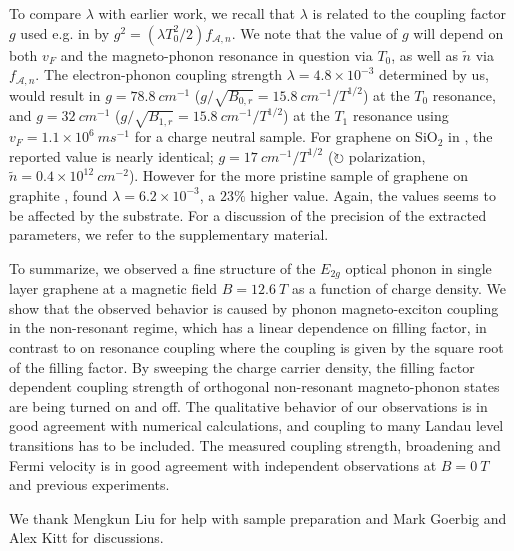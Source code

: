 \documentclass[prl,aps,superscriptaddress,showpacs,reprint]{revtex4-1}
\begin{document}
To compare $\lambda$ with earlier work, we recall that $\lambda$ is related to the coupling factor $g$ used e.g. in \cite{yan2010observation,PhysRevLett.110.227402} by $g^2=(\lambda T_0^2/2) f_{\mathcal{A},n}$.  We note that  the value of $g$ will depend on both $v_F$ and the magneto-phonon resonance in question via $T_0$, as well as $\widetilde{n}$ via $f_{\mathcal{A},n}$.
The electron-phonon coupling strength $\lambda=4.8\times 10^{-3}$ determined by us,
would result in $g=78.8\: cm^{-1}$  ($ g/\sqrt{B_{0,r}}=15.8 \:  cm^{-1}/T^{1/2}$) at the $T_0$ resonance, and  $ g=32\: cm^{-1}$ ($ g/\sqrt{B_{1,r}}=15.8\: cm^{-1}/T^{1/2}$) at the $T_1$ resonance using $v_F=1.1\times 10^6\: ms^{-1}$ for a charge neutral sample. For graphene on SiO$_2$  in \cite{PhysRevLett.110.227402}, the reported value is nearly identical;  $ g=17\: cm^{-1}/T^{1/2}$ ($\circlearrowright$ polarization, $\widetilde{n}=0.4\times 10^{12}\: cm^{-2}$).    However for the  more pristine sample of  graphene on graphite \cite{yan2010observation},  found $\lambda= 6.2 \times 10^{-3}$, a $23\%$ higher value. Again, the values seems to be affected by the substrate.  For a discussion of the precision of the extracted parameters, we refer to the supplementary material.

To summarize,  we observed a fine structure of the $E_{2g}$ optical phonon in single layer graphene at a magnetic field $B=12.6\: T$ as a function of charge density. We show that the observed behavior is caused by phonon magneto-exciton coupling in the non-resonant regime, which has a linear dependence on filling factor, in contrast to on resonance coupling where the coupling is given by the square root of the filling factor.  By sweeping the charge carrier density, the filling factor dependent coupling strength of orthogonal non-resonant  magneto-phonon states are being turned on and off.  The qualitative behavior of our observations is in good agreement with numerical calculations, and coupling to many Landau level transitions has to be included. The measured  coupling strength, broadening and Fermi velocity is in good agreement with independent observations at $B=0\: T$ and previous experiments.
\\

\begin{acknowledgments}
We thank Mengkun Liu for help with sample preparation and Mark Goerbig and Alex Kitt for discussions.
\end{acknowledgments}



\end{document}
